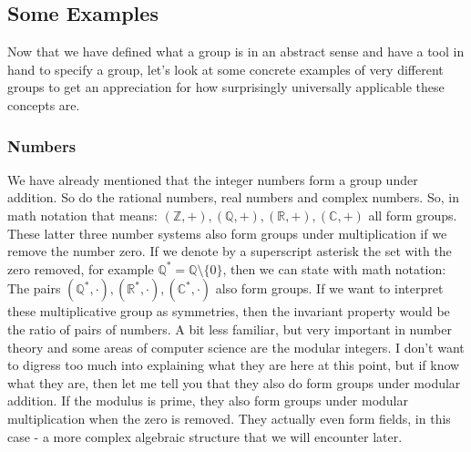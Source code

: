 


\subsection{Some Examples}
Now that we have defined what a group is in an abstract sense and have a tool in hand to specify a group, let's look at some concrete examples of very different groups to get an appreciation for how surprisingly universally applicable these concepts are.

\subsubsection{Numbers}
We have already mentioned that the integer numbers form a group under addition. So do the rational numbers, real numbers and complex numbers. So, in math notation that means:  $(\mathbb{Z}, +), (\mathbb{Q}, +), (\mathbb{R}, +), (\mathbb{C}, +)$ all form groups. These latter three number systems also form groups under multiplication if we remove the number zero. If we denote by a superscript asterisk the set with the zero removed, for example $\mathbb{Q}^{\ast} = \mathbb{Q} \setminus \{0\}$, then we can state with math notation: The pairs $(\mathbb{Q}^{\ast}, \cdot), (\mathbb{R}^{\ast}, \cdot), (\mathbb{C}^{\ast}, \cdot)$ also form groups. If we want to interpret these multiplicative group as symmetries, then the invariant property would be the ratio of pairs of numbers. A bit less familiar, but very important in number theory and some areas of computer science are the modular integers. I don't want to digress too much into explaining what they are here at this point, but if know what they are, then let me tell you that they also do form groups under modular addition. If the modulus is prime, they also form groups under modular multiplication when the zero is removed. They actually even form fields, in this case - a more complex algebraic structure that we will encounter later. %

